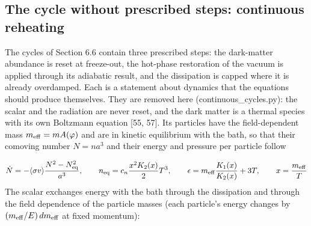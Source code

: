 \documentclass[11pt,a4paper]{article}
\begin{document}
\subsection{The cycle without prescribed steps: continuous reheating}
The cycles of Section 6.6 contain three prescribed steps: the dark-matter abundance is reset at freeze-out, the hot-phase restoration of the vacuum is applied through its adiabatic result, and the dissipation is capped where it is already overdamped. Each is a statement about dynamics that the equations should produce themselves. They are removed here (continuous\_cycles.py): the scalar and the radiation are never reset, and the dark matter is a thermal species with its own Boltzmann equation [55, 57]. Its particles have the field-dependent mass $m_{\rm eff}=mA(\varphi)$ and are in kinetic equilibrium with the bath, so that their comoving number $N=na^3$ and their energy and pressure per particle follow

\begin{equation}
\dot N=-\langle\sigma v\rangle\frac{N^2-N_{\rm eq}^2}{a^3},\qquad n_{\rm eq}=c_n\frac{x^2K_2(x)}{2}T^3,\qquad \epsilon=m_{\rm eff}\frac{K_1(x)}{K_2(x)}+3T,\qquad x=\frac{m_{\rm eff}}{T}
\end{equation}
The scalar exchanges energy with the bath through the dissipation and through the field dependence of the particle masses (each particle's energy changes by $(m_{\rm eff}/E)\,dm_{\rm eff}$ at fixed momentum):
\end{document}

